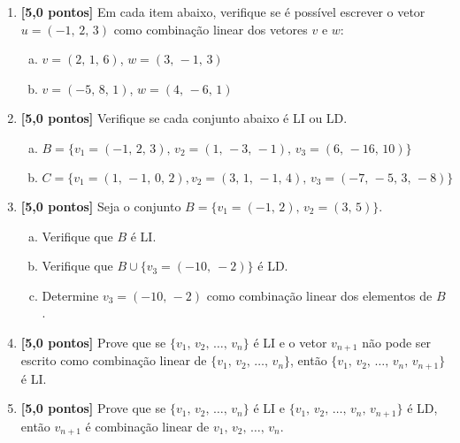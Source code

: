 \documentclass[12pt,a4paper]{article}
\begin{document}
\begin{enumerate}

  \item \textbf{[5,0 pontos]} Em cada item abaixo, verifique se é possível
  escrever o vetor $u = (-1,\, 2,\, 3)$ como combinação linear dos vetores 
  $v$ e $w$:
    \begin{enumerate}[(a)]
      \item $v = (2,\, 1,\, 6)$,  $w = (3,\, -1,\, 3)$
      \item $v = (-5,\, 8,\, 1)$, $w = (4,\, -6,\, 1)$
    \end{enumerate}
  
  \item \textbf{[5,0 pontos]} Verifique se cada conjunto abaixo é LI ou LD.
    \begin{enumerate}[(a)]
      \item $B = \{v_1 = (-1,\, 2,\, 3),\, v_2 = (1,\, -3,\, -1),\, v_3 = (6,\, -16,\, 10)\}$
      \item $C = \{v_1 = (1,\, -1,\, 0,\, 2), v_2 = (3,\, 1,\, -1,\, 4),\, v_3 = (-7,\, -5,\, 3,\, -8)\}$
    \end{enumerate}

  \item \textbf{[5,0 pontos]} Seja o conjunto $B = \{v_1 = (-1,\, 2),\, v_2 = (3,\, 5)\}$.
    \begin{enumerate}[(a)]
      \item Verifique que $B$ é LI.
      \item Verifique que $B\cup\{v_3 = (-10,\ -2)\}$ é LD.
      \item Determine $v_3 = (-10,\, -2)$ como combinação linear dos elementos de $B$.
    \end{enumerate}
    
  \item \textbf{[5,0 pontos]} Prove que se $\{v_1,\, v_2,\, \ldots,\, v_n\}$ é LI e o vetor $v_{n+1}$ não
    pode ser escrito como combinação linear de $\{v_1,\, v_2,\, \ldots,\, v_n\}$,
    então $\{v_1,\, v_2,\, \ldots,\, v_n,\, v_{n+1}\}$ é LI.
   
  \item \textbf{[5,0 pontos]} Prove que se $\{v_1,\,v_2,\,\ldots,\,v_n\}$ é LI
    e $\{v_1,\,v_2,\,\ldots,\,v_n,\,v_{n+1}\}$ é LD, então $v_{n+1}$ é
    combinação linear de $v_1,\,v_2,\,\ldots,\,v_n$.
    
 
\end{enumerate}
\end{document}
